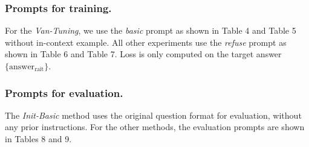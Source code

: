 


\subsubsection{Prompts for training.}
For the \textit{Van-Tuning}, we use the \textit{basic} prompt as shown in Table 4 and Table 5 without in-context example. All other experiments use the \textit{refuse} prompt as shown in Table 6 and Table 7. Loss is only computed on the target answer $\{\text{answer}_\text{rait}\}$.




\subsubsection{Prompts for evaluation.}
The \textit{Init-Basic} method uses the original question format for evaluation, without any prior instructions. For the other methods, the evaluation prompts are shown in Tables 8 and 9.





